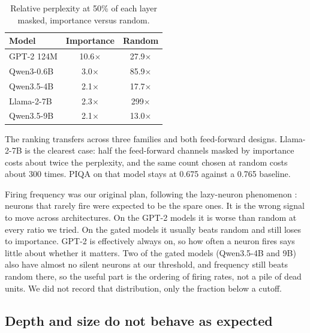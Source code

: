 \documentclass{article}
\begin{document}
\begin{table}[t]
  \caption{Relative perplexity at 50\% of each layer masked, importance versus random.}
  \label{tab:ppl50}
  \begin{center}
    \begin{small}
      \begin{sc}
        \begin{tabular}{lcc}
          \toprule
          Model & Importance & Random \\
          \midrule
          GPT-2 124M & 10.6$\times$ & 27.9$\times$ \\
          Qwen3-0.6B & 3.0$\times$ & 85.9$\times$ \\
          Qwen3.5-4B & 2.1$\times$ & 17.7$\times$ \\
          Llama-2-7B & 2.3$\times$ & 299$\times$ \\
          Qwen3.5-9B & 2.1$\times$ & 13.0$\times$ \\
          \bottomrule
        \end{tabular}
      \end{sc}
    \end{small}
  \end{center}
  \vskip -0.1in
\end{table}

The ranking transfers across three families and both feed-forward designs.
Llama-2-7B is the clearest case: half the feed-forward channels masked by importance costs about twice the perplexity, and the same count chosen at random costs about 300 times.
PIQA on that model stays at 0.675 against a 0.765 baseline.

Firing frequency was our original plan, following the lazy-neuron phenomenon \citep{li2023lazy}: neurons that rarely fire were expected to be the spare ones.
It is the wrong signal to move across architectures.
On the GPT-2 models it is worse than random at every ratio we tried.
On the gated models it usually beats random and still loses to importance.
GPT-2 is effectively always on, so how often a neuron fires says little about whether it matters.
Two of the gated models (Qwen3.5-4B and 9B) also have almost no silent neurons at our threshold, and frequency still beats random there, so the useful part is the ordering of firing rates, not a pile of dead units.
We did not record that distribution, only the fraction below a cutoff.

\subsection{Depth and size do not behave as expected}
\end{document}
